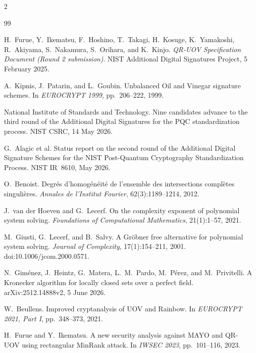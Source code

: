 \documentclass[11pt,a4paper]{article}
\theoremstyle{definition}
\theoremstyle{remark}
\begin{document}
\begin{multicols}{2}
\raggedcolumns
\begin{thebibliography}{99}
\fontsize{8.5pt}{9.6pt}\selectfont
\setlength{\itemsep}{0pt}
\setlength{\parsep}{0pt}

H.~Furue, Y.~Ikematsu, F.~Hoshino, T.~Takagi, H.~Kosuge, K.~Yamakoshi, R.~Akiyama, S.~Nakamura, S.~Orihara, and K.~Kinjo.
\newblock \emph{QR-UOV Specification Document (Round 2 submission)}.
\newblock NIST Additional Digital Signatures Project, 5 February 2025.

A.~Kipnis, J.~Patarin, and L.~Goubin.
\newblock Unbalanced Oil and Vinegar signature schemes.
\newblock In \emph{EUROCRYPT 1999}, pp.~206--222, 1999.

National Institute of Standards and Technology.
\newblock Nine candidates advance to the third round of the Additional Digital Signatures for the PQC standardization process.
\newblock NIST CSRC, 14 May 2026.

G.~Alagic et al.
\newblock Status report on the second round of the Additional Digital Signature Schemes for the NIST Post-Quantum Cryptography Standardization Process.
\newblock NIST IR~8610, May 2026.

O.~Benoist.
\newblock Degr\'es d'homog\'en\'eit\'e de l'ensemble des intersections compl\`etes singuli\`eres.
\newblock \emph{Annales de l'Institut Fourier}, 62(3):1189--1214, 2012.

J.~van der Hoeven and G.~Lecerf.
\newblock On the complexity exponent of polynomial system solving.
\newblock \emph{Foundations of Computational Mathematics}, 21(1):1--57, 2021.

M.~Giusti, G.~Lecerf, and B.~Salvy.
\newblock A Gr\"obner free alternative for polynomial system solving.
\newblock \emph{Journal of Complexity}, 17(1):154--211, 2001.
\newblock doi:10.1006/jcom.2000.0571.

N.~Gim\'enez, J.~Heintz, G.~Matera, L.~M.~Pardo, M.~P\'erez, and M.~Privitelli.
\newblock A Kronecker algorithm for locally closed sets over a perfect field.
\newblock arXiv:2512.14888v2, 5 June 2026.

W.~Beullens.
\newblock Improved cryptanalysis of UOV and Rainbow.
\newblock In \emph{EUROCRYPT 2021, Part I}, pp.~348--373, 2021.

H.~Furue and Y.~Ikematsu.
\newblock A new security analysis against MAYO and QR-UOV using rectangular MinRank attack.
\newblock In \emph{IWSEC 2023}, pp.~101--116, 2023.


\end{thebibliography}
\end{multicols}
\end{document}
